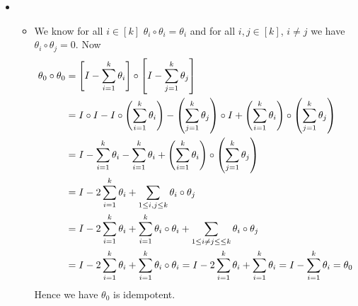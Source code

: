 \documentclass[a4paper, 11pt]{article}
\begin{document}
{\begin{itemize}
\begin{itemize}
	\item 	\textbf{Backward Direction $\boldsymbol{(\Leftarrow)}$:} Suppose $V=\Im\theta\oplus \ker\theta$. For any $v\in V$, $\exs!\ u\in\Im\theta,\ w\in\ker\theta$, such that $v=u+w$. Since $\theta(v)$ is the projection of $v$ onto $\Im\theta$ we have $u=\theta(v)$. Then $v=\theta(v)+w$ where $\theta(w)=0$. Hence we have $$\theta(v)=\theta(\theta(v)+w)=\theta\circ\theta(v)+\theta(w)=\theta\circ\theta(v)$$Hence we have for all $v\in V$, $\theta(v)=\theta\circ\theta(v)$. Therefore $\theta \circ\theta=\theta$ i.e. $\theta$ is idempotent.
	\end{itemize}
Hence we have $\theta $ is idempotent $\iff V=\Im\theta\oplus \ker\theta$ and for all $v\in V$, $\theta(v)$ is just the projection of $v$ onto  $\Im\theta$. 
\item \begin{itemize}
	\item We know for all $i\in[k]$ $\theta_i\circ\theta_i=\theta_i$ and for all $i,j\in[k]$, $i\neq j$ we have $\theta_i\circ\theta_j=0$. Now \begin{align*}
		\theta_0\circ \theta_0 & =  \left[I-\sum_{i=1}^k\theta_i\right]\circ\left[I-\sum_{j=1}^k\theta_j\right]\\
		& = I\circ I -I\circ\left(\sum_{i=1}^k\theta_i\right) - \left(\sum_{j=1}^k\theta_j\right)\circ I +\left(\sum_{i=1}^k\theta_i\right)\circ \left(\sum_{j=1}^k\theta_j\right)\\
		& = I-\sum_{i=1}^k\theta_i-\sum_{i=1}^k\theta_i+\left(\sum_{i=1}^k\theta_i\right)\circ \left(\sum_{j=1}^k\theta_j\right)\\
		& = I-2\sum_{i=1}^k\theta_i+\sum_{1\leq i,j\leq k}\theta_i\circ \theta_j\\
		& =  I-2\sum_{i=1}^k\theta_i+\sum_{i=1}^k\theta_i\circ\theta_i+\sum_{1\leq i\neq j\leq \leq k}\theta_i\circ \theta_j\\
		& = I-2\sum_{i=1}^k\theta_i+\sum_{i=1}^k\theta_i\circ\theta_i = I-2\sum_{i=1}^k\theta_i+\sum_{i=1}^k\theta_i = I-\sum_{i=1}^k\theta_i=\theta_0
	\end{align*}Hence we have $\theta_0$ is idempotent. 
	

\end{itemize}
\end{itemize}}
\end{document}

